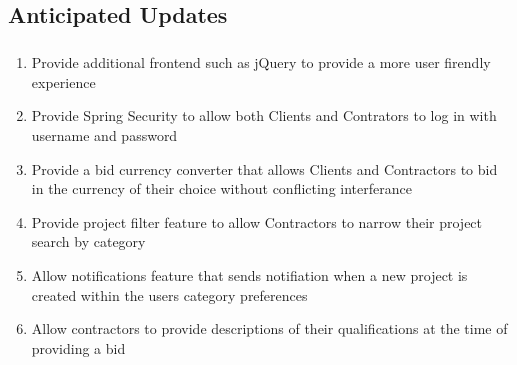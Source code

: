 \documentclass[a4paper,12pt]{article}
\begin{document}
\subsection{Anticipated Updates}\subparagraph{}
\begin{enumerate}[label=(\alph*)]
\item Provide additional frontend such as jQuery to provide a more user firendly experience
\item Provide Spring Security to allow both Clients and Contrators to log in with username and password
\item Provide a bid currency converter that allows Clients and Contractors to bid in the currency of their choice without conflicting interferance
\item Provide project filter feature to allow Contractors to narrow their project search by category
\item Allow notifications feature that sends notifiation when a new project is created within the users category preferences
\item Allow contractors to provide descriptions of their qualifications at the time of providing a bid
\end{enumerate}
\end{document}
